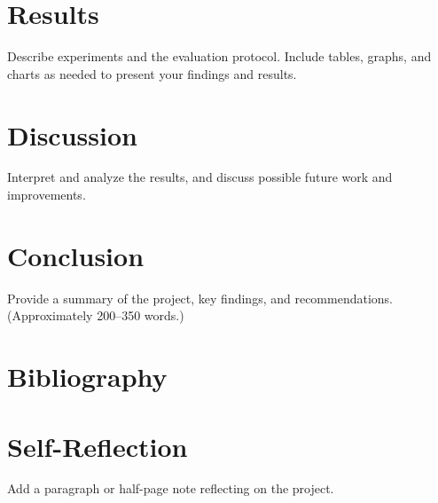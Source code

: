 \documentclass[12pt]{article}
\begin{document}
\section{Results}
Describe experiments and the evaluation protocol. Include tables, graphs, and charts as needed to present your findings and results.

\section{Discussion}
Interpret and analyze the results, and discuss possible future work and improvements.

\section{Conclusion}
Provide a summary of the project, key findings, and recommendations. (Approximately 200--350 words.)

\section{Bibliography}

\printbibliography[heading=none]

\section{Self-Reflection}
Add a paragraph or half-page note reflecting on the project.
\end{document}
